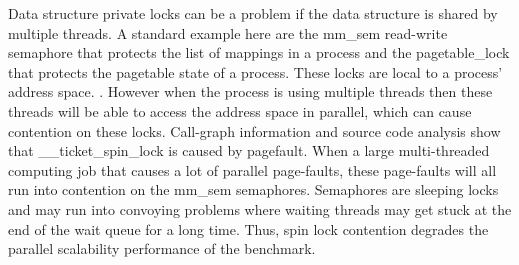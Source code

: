 Data structure private locks can be a problem 
if the data structure is shared by multiple threads. 
A standard example here are the mm\_sem read-write semaphore 
that protects the list of mappings in a process and 
the pagetable\_lock that protects the pagetable state of a process. 
These locks are local to a process’ address space. 
. 
However when the process is using multiple threads 
then these threads will be able to access the address space in parallel,
which can cause contention on these locks.
Call-graph information and source code analysis show that 
\_\_ticket\_spin\_lock is caused by pagefault.
When a large multi-threaded computing job 
that causes a lot of parallel page-faults, 
these page-faults will all run into contention on the mm\_sem semaphores.
Semaphores are sleeping locks 
and may run into convoying problems 
where waiting threads may 
get stuck at the end of the wait queue for a long time.\cite{Andi2009lmulticore}
Thus, spin lock 
contention degrades the parallel scalability performance of 
the benchmark. 






